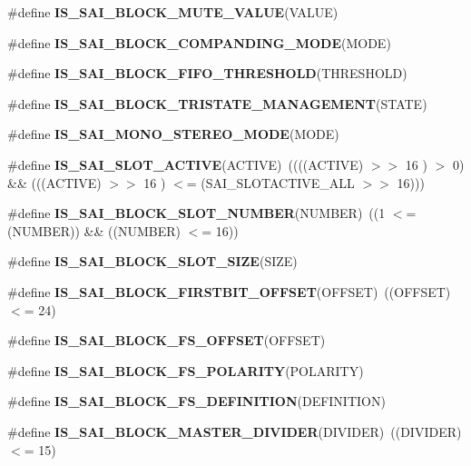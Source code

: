 \begin{DoxyCompactItemize}
\item 
\#define {\bfseries I\+S\+\_\+\+S\+A\+I\+\_\+\+B\+L\+O\+C\+K\+\_\+\+M\+U\+T\+E\+\_\+\+V\+A\+L\+UE}(V\+A\+L\+UE)
\item 
\#define {\bfseries I\+S\+\_\+\+S\+A\+I\+\_\+\+B\+L\+O\+C\+K\+\_\+\+C\+O\+M\+P\+A\+N\+D\+I\+N\+G\+\_\+\+M\+O\+DE}(M\+O\+DE)
\item 
\#define {\bfseries I\+S\+\_\+\+S\+A\+I\+\_\+\+B\+L\+O\+C\+K\+\_\+\+F\+I\+F\+O\+\_\+\+T\+H\+R\+E\+S\+H\+O\+LD}(T\+H\+R\+E\+S\+H\+O\+LD)
\item 
\#define {\bfseries I\+S\+\_\+\+S\+A\+I\+\_\+\+B\+L\+O\+C\+K\+\_\+\+T\+R\+I\+S\+T\+A\+T\+E\+\_\+\+M\+A\+N\+A\+G\+E\+M\+E\+NT}(S\+T\+A\+TE)
\item 
\#define {\bfseries I\+S\+\_\+\+S\+A\+I\+\_\+\+M\+O\+N\+O\+\_\+\+S\+T\+E\+R\+E\+O\+\_\+\+M\+O\+DE}(M\+O\+DE)
\item 
\#define {\bfseries I\+S\+\_\+\+S\+A\+I\+\_\+\+S\+L\+O\+T\+\_\+\+A\+C\+T\+I\+VE}(A\+C\+T\+I\+VE)~((((A\+C\+T\+I\+VE) $>$$>$ 16 )  $>$ 0) \&\& (((A\+C\+T\+I\+VE) $>$$>$ 16 )  $<$= (S\+A\+I\+\_\+\+S\+L\+O\+T\+A\+C\+T\+I\+V\+E\+\_\+\+A\+LL $>$$>$ 16)))\hypertarget{group___s_a_i___private___macros_ga7eeddcc309661737b2b4d88afa42e21a}{}\label{group___s_a_i___private___macros_ga7eeddcc309661737b2b4d88afa42e21a}

\item 
\#define {\bfseries I\+S\+\_\+\+S\+A\+I\+\_\+\+B\+L\+O\+C\+K\+\_\+\+S\+L\+O\+T\+\_\+\+N\+U\+M\+B\+ER}(N\+U\+M\+B\+ER)~((1 $<$= (N\+U\+M\+B\+ER)) \&\& ((N\+U\+M\+B\+ER) $<$= 16))\hypertarget{group___s_a_i___private___macros_ga7c2620a4203a01ceceea9d82e5af69a9}{}\label{group___s_a_i___private___macros_ga7c2620a4203a01ceceea9d82e5af69a9}

\item 
\#define {\bfseries I\+S\+\_\+\+S\+A\+I\+\_\+\+B\+L\+O\+C\+K\+\_\+\+S\+L\+O\+T\+\_\+\+S\+I\+ZE}(S\+I\+ZE)
\item 
\#define {\bfseries I\+S\+\_\+\+S\+A\+I\+\_\+\+B\+L\+O\+C\+K\+\_\+\+F\+I\+R\+S\+T\+B\+I\+T\+\_\+\+O\+F\+F\+S\+ET}(O\+F\+F\+S\+ET)~((O\+F\+F\+S\+ET) $<$= 24)\hypertarget{group___s_a_i___private___macros_ga002a033a6becd7e27b0895ef288979da}{}\label{group___s_a_i___private___macros_ga002a033a6becd7e27b0895ef288979da}

\item 
\#define {\bfseries I\+S\+\_\+\+S\+A\+I\+\_\+\+B\+L\+O\+C\+K\+\_\+\+F\+S\+\_\+\+O\+F\+F\+S\+ET}(O\+F\+F\+S\+ET)
\item 
\#define {\bfseries I\+S\+\_\+\+S\+A\+I\+\_\+\+B\+L\+O\+C\+K\+\_\+\+F\+S\+\_\+\+P\+O\+L\+A\+R\+I\+TY}(P\+O\+L\+A\+R\+I\+TY)
\item 
\#define {\bfseries I\+S\+\_\+\+S\+A\+I\+\_\+\+B\+L\+O\+C\+K\+\_\+\+F\+S\+\_\+\+D\+E\+F\+I\+N\+I\+T\+I\+ON}(D\+E\+F\+I\+N\+I\+T\+I\+ON)
\item 
\#define {\bfseries I\+S\+\_\+\+S\+A\+I\+\_\+\+B\+L\+O\+C\+K\+\_\+\+M\+A\+S\+T\+E\+R\+\_\+\+D\+I\+V\+I\+D\+ER}(D\+I\+V\+I\+D\+ER)~((D\+I\+V\+I\+D\+ER) $<$= 15)\hypertarget{group___s_a_i___private___macros_ga5f1005dcd3fa598e5251c8a441b7f95a}{}\label{group___s_a_i___private___macros_ga5f1005dcd3fa598e5251c8a441b7f95a}


\end{DoxyCompactItemize}
